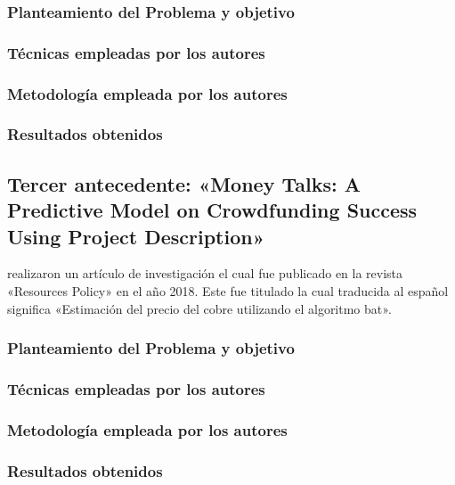 \subsubsection{Planteamiento del Problema y objetivo }


\subsubsection{Técnicas empleadas por los autores}
 

\subsubsection{Metodología empleada por los autores}


\subsubsection{Resultados obtenidos}



\subsection{Tercer antecedente: «Money Talks: A Predictive Model on Crowdfunding Success Using Project Description» \citep*{pr_zhou2018projectdesc}}
\citeauthor{pr_zhou2018projectdesc} realizaron un artículo de investigación el cual fue publicado en la revista «Resources Policy» en el año 2018. Este fue titulado  la cual traducida al español significa «Estimación del precio del cobre utilizando el algoritmo bat».

\subsubsection{Planteamiento del Problema y objetivo }


\subsubsection{Técnicas empleadas por los autores}


\subsubsection{Metodología empleada por los autores}


\subsubsection{Resultados obtenidos}



